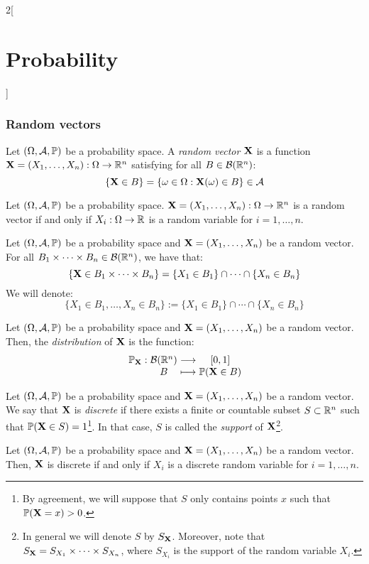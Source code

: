 \documentclass[../../../main.tex]{subfiles}
\begin{document}
\begin{multicols}{2}[\section{Probability}]
  \subsubsection{Random vectors}
  \begin{definition}
    Let $(\Omega,\mathcal{A},\mathbb{P})$ be a probability space. A \textit{random vector $\boldsymbol{\mathrm{X}}$} is a function $\boldsymbol{\mathrm{X}}=(X_1,\ldots,X_n):\Omega\rightarrow\mathbb{R}^n$ satisfying for all $B\in\mathcal{B}(\mathbb{R}^n)$: $$\{\boldsymbol{\mathrm{X}}\in B\}=\{\omega\in\Omega:\boldsymbol{\mathrm{X}}(\omega)\in B\}\in\mathcal{A}$$
  \end{definition}
  \begin{prop}
    Let $(\Omega,\mathcal{A},\mathbb{P})$ be a probability space. $\boldsymbol{\mathrm{X}}=(X_1,\ldots,X_n):\Omega\rightarrow\mathbb{R}^n$ is a random vector if and only if $X_i:\Omega\rightarrow\mathbb{R}$ is a random variable for $i=1,\ldots,n$.
  \end{prop}
  \begin{definition}
    Let $(\Omega,\mathcal{A},\mathbb{P})$ be a probability space and $\boldsymbol{\mathrm{X}}=(X_1,\ldots,X_n)$ be a random vector. For all $B_1\times\cdots\times B_n\in\mathcal{B}(\mathbb{R}^n)$, we have that: $$\{\boldsymbol{\mathrm{X}}\in B_1\times\cdots\times B_n\}=\{X_1\in B_1\}\cap\cdots\cap\{X_n\in B_n\}$$ We will denote: $$\{X_1\in B_1,\ldots,X_n\in B_n\}:=\{X_1\in B_1\}\cap\cdots\cap\{X_n\in B_n\}$$
  \end{definition}
  \begin{definition}
    Let $(\Omega,\mathcal{A},\mathbb{P})$ be a probability space and $\boldsymbol{\mathrm{X}}=(X_1,\ldots,X_n)$ be a random vector. Then, the \textit{distribution} of $\boldsymbol{\mathrm{X}}$ is the function:
    $$
      \function{\Prob_{\vf{X}}}{\mathcal{B}(\RR^n)}{[0,1]}{B}{\Prob(\vf{X}\in B)}
    $$
  \end{definition}
  \begin{definition}
    Let $(\Omega,\mathcal{A},\mathbb{P})$ be a probability space and $\boldsymbol{\mathrm{X}}=(X_1,\ldots,X_n)$ be a random vector. We say that $\boldsymbol{\mathrm{X}}$ is \textit{discrete} if there exists a finite or countable subset $S\subset\mathbb{R}^n$ such that $\mathbb{P}(\boldsymbol{\mathrm{X}}\in S)=1$\footnote{By agreement, we will suppose that $S$ only contains points $x$ such that $\mathbb{P}(\boldsymbol{\mathrm{X}}=x)>0$.}. In that case, $S$ is called the \textit{support} of $\boldsymbol{\mathrm{X}}$\footnote{In general we will denote $S$ by $S_{\boldsymbol{\mathrm{X}}}$. Moreover, note that $S_{\boldsymbol{\mathrm{X}}}=S_{X_1}\times\cdots\times S_{X_n}$, where $S_{X_i}$ is the support of the random variable $X_i$.}.
  \end{definition}
  \begin{prop}
    Let $(\Omega,\mathcal{A},\mathbb{P})$ be a probability space and $\boldsymbol{\mathrm{X}}=(X_1,\ldots,X_n)$ be a random vector. Then, $\boldsymbol{\mathrm{X}}$ is discrete if and only if $X_i$ is a discrete random variable for $i=1,\ldots,n$.

\end{prop}
\end{multicols}
\end{document}
